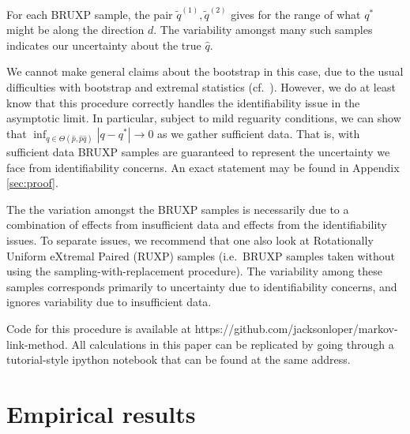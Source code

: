 For each BRUXP sample, the pair $\tilde q^{(1)},\tilde q^{(2)}$ gives for the range of what $q^*$ might be along the direction $d$.  The variability amongst many such samples indicates our uncertainty about the true $\hat q$.  

We cannot make general claims about the bootstrap in this case, due to the usual difficulties with bootstrap and extremal statistics (cf.\ \cite{andrews2000inconsistency}).  However, we do at least know that this procedure correctly handles the identifiability issue in the asymptotic limit.  In particular, subject to mild reguarity conditions, we can show that $\inf_{q\in \Theta(\hat p, \hat p \hat q)} |q-q^*|\rightarrow 0$ as we gather sufficient data.  That is, with sufficient data BRUXP samples are guaranteed to represent the uncertainty we face from identifiability concerns.  An exact statement may be found in Appendix \ref{sec:proof}.

The the variation amongst the BRUXP samples is necessarily due to a combination of effects from insufficient data and effects from the identifiability issues.  To separate issues, we recommend that one also look at Rotationally Uniform eXtremal Paired (RUXP) samples (i.e.\ BRUXP samples taken without using the sampling-with-replacement procedure).  The variability among these samples corresponds primarily to uncertainty due to identifiability concerns, and ignores variability due to insufficient data.  

Code for this procedure is available at https://github.com/jacksonloper/markov-link-method.  All calculations in this paper can be replicated by going through a tutorial-style ipython notebook that can be found at the same address.

\section{Empirical results}


